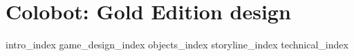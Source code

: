 
\part{Colobot: Gold Edition design}

{intro_index}
{game_design_index}
{objects_index}
{storyline_index}
{technical_index}
